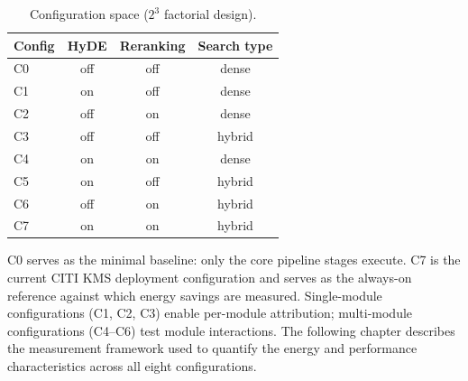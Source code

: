 
\begin{table}[H]
\centering
\begin{tabular}{lccc}
\hline
\textbf{Config} & \textbf{HyDE} & \textbf{Reranking} & \textbf{Search type} \\
\hline
C0 & off & off & dense   \\
C1 & on  & off & dense   \\
C2 & off & on  & dense   \\
C3 & off & off & hybrid  \\
C4 & on  & on  & dense   \\
C5 & on  & off & hybrid  \\
C6 & off & on  & hybrid  \\
C7 & on  & on  & hybrid  \\
\hline
\end{tabular}
\caption{Configuration space ($2^3$ factorial design).}
\label{tab:config-space}
\end{table}

C0 serves as the minimal baseline: only the core pipeline stages execute. C7 is the
current CITI KMS deployment configuration and serves as the always-on reference against
which energy savings are measured. Single-module configurations (C1, C2, C3) enable
per-module attribution; multi-module configurations (C4--C6) test module interactions.
The following chapter describes the measurement framework used to quantify
the energy and performance characteristics across all eight configurations.
